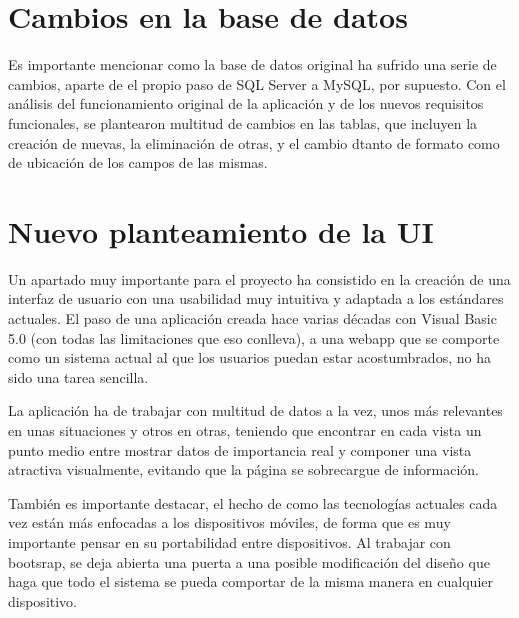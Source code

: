 \section{Cambios en la base de datos}

Es importante mencionar como la base de datos original ha sufrido una serie de cambios,  aparte de el propio paso de SQL Server a MySQL, por supuesto. Con el análisis del funcionamiento original de la aplicación y de los nuevos requisitos funcionales, se plantearon multitud de cambios en las tablas, que incluyen la creación de nuevas, la eliminación de otras, y el cambio dtanto de formato como de ubicación de los campos de las mismas.

\section{Nuevo planteamiento de la UI}

Un apartado muy importante para el proyecto ha consistido en la creación de una interfaz de usuario con una usabilidad muy intuitiva y adaptada a los estándares actuales. El paso de una aplicación creada hace varias décadas con Visual Basic 5.0 (con todas las limitaciones que eso conlleva), a una webapp que se comporte como un sistema actual al que los usuarios puedan estar acostumbrados, no ha sido una tarea sencilla. 

La aplicación ha de trabajar con multitud de datos a la vez, unos más relevantes en unas situaciones y otros en otras, teniendo que encontrar en cada vista un punto medio entre mostrar datos de importancia real y componer una vista atractiva visualmente, evitando que la página se sobrecargue de información.

También es importante destacar, el hecho de como las tecnologías actuales cada vez están más enfocadas a los dispositivos móviles, de forma que es muy importante pensar en su portabilidad entre dispositivos. Al trabajar con bootsrap, se deja abierta una puerta a una posible modificación del diseño que haga que todo el sistema se pueda comportar de la misma manera en cualquier dispositivo.  